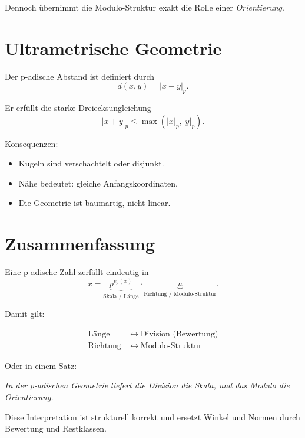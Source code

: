 \documentclass[12pt]{article}
\begin{document}
Dennoch übernimmt die Modulo-Struktur exakt die Rolle einer \emph{Orientierung}.

\section{Ultrametrische Geometrie}

Der p-adische Abstand ist definiert durch
\[
d(x,y) = |x-y|_p.
\]

Er erfüllt die starke Dreiecksungleichung
\[
|x+y|_p \le \max(|x|_p, |y|_p).
\]

Konsequenzen:
\begin{itemize}
  \item Kugeln sind verschachtelt oder disjunkt.
  \item Nähe bedeutet: gleiche Anfangskoordinaten.
  \item Die Geometrie ist baumartig, nicht linear.
\end{itemize}

\section{Zusammenfassung}

Eine p-adische Zahl zerfällt eindeutig in
\[
x = \underbrace{p^{v_p(x)}}_{\text{Skala / Länge}}
\cdot
\underbrace{u}_{\text{Richtung / Modulo-Struktur}}.
\]

Damit gilt:

\[
\boxed{
\begin{aligned}
\text{Länge} &\;\longleftrightarrow\; \text{Division (Bewertung)} \\
\text{Richtung} &\;\longleftrightarrow\; \text{Modulo-Struktur}
\end{aligned}
}
\]

Oder in einem Satz:

\begin{center}
\emph{In der p-adischen Geometrie liefert die Division die Skala, und das Modulo die Orientierung.}
\end{center}

Diese Interpretation ist strukturell korrekt und ersetzt Winkel und Normen durch Bewertung und Restklassen.
\end{document}
